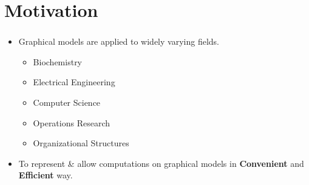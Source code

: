 \documentclass[mathserif,10pt]{beamer}
\newcommand{\cmt}[1]{}
\begin{document}
\section{Motivation}
\frame
{
  \frametitle{\secname}
  \begin{itemize}%
    \item Graphical models are applied to widely varying fields.
    \begin{itemize}
      \item Biochemistry 
        \cmt{genomics}
      \item Electrical Engineering
        \cmt{communication networks }
      \item Computer Science
        \cmt{Algorithms and computation}
      \item Operations Research
        \cmt{Scheduling}
      \item Organizational Structures 
        \cmt{social networking}
    \end{itemize} 
    \vspace{1cm}
    \item To represent \& allow computations on  graphical models in \textbf{Convenient} and \textbf{Efficient} way.
      \cmt{
Convenience: is essential so that even for domain experts who are not coding experts
can code and reason about their implementation. Ease of interface could be due to:
– Expressive power of the language representing those models.
– Intuitive extensibility of the language.
– Ability of the language to provide exploratory programming, where the user may
experiment with different ideas (without dwelling much into the language syntax)
before coming to a conclusive one.

Designed language need to be efficient in the following sense.
– Underlying design decisions including data structures need to be carefully crafted to
achieve expected run-time w.r.t the input size.
– Implementation need to be scalable w.r.t the space/time requirements. This is im-
portant because most of the graph algorithm typically work on huge input sizes.

To meet all above goals and most importantly exploratory programming, we decided to work
on a dynamically typed language to represent graphs and apply various computations on them.
With a dynamically typed language the user do not have to worry much about declaring types
and can focus mostly on his/her experiments.
      }
    \vspace{1cm}
  \end{itemize} 
}
\end{document}
